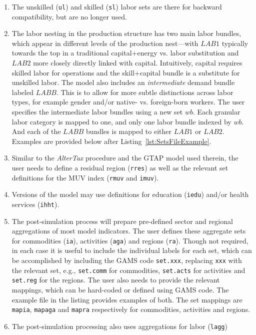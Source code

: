 \begin{enumerate}
\item The unskilled (\texttt{ul}) and skilled (\texttt{sl}) labor sets are there for
backward compatibility, but are no longer used.
\item The labor nesting in the production structure has two main labor bundles,
which appear in different levels of the production nest---with
$\mathit{LAB1}$ typically towards the top in a traditional capital+energy vs. labor
substitution and $\mathit{LAB2}$ more closely directly linked with capital. Intuitively,
capital requires skilled labor for operations and the skill+capital
bundle is a substitute for unskilled labor.
The model also includes an \emph{intermediate}
demand bundle labeled $\mathit{LABB}$. This is to allow for more
subtle distinctions across labor types, for example gender and/or
native- vs. foreign-born workers. The user specifies the
intermediate labor bundles using a new set $\mathit{wb}$. Each
granular labor category is mapped to one, and only one labor bundle
indexed by $\mathit{wb}$. And each of the $\mathit{LABB}$ bundles is mapped to
either $\mathit{LAB1}$ or $\mathit{LAB2}$. Examples are provided below
after Listing~\ref{lst:SetsFileExample}.
\item Similar to the \emph{AlterTax} procedure and the GTAP model used therein, the
user needs to define a residual region (\texttt{rres}) as well as the
relevant set definitions for the MUV index (\texttt{rmuv} and \texttt{imuv}).
\item Versions of the model may use definitions for education (\texttt{iedu}) and/or health
services (\texttt{ihht}).
\item The post-simulation process will prepare pre-defined sector and regional
aggregations of most model indicators. The user defines these aggregate
sets for commodities (\texttt{ia}), activities (\texttt{aga}) and regions (\texttt{ra}).
Though not required, in each case it is useful to include the individual labels
for each set, which can be accomplished by including the GAMS code \texttt{set.xxx},
replacing \texttt{xxx} with the relevant set, e.g., \texttt{set.comm} for commodities,
\texttt{set.acts} for activities and \texttt{set.reg} for the regions.
The user also needs to provide the relevant mappings, which can be
hard-coded or defined using GAMS code. The example file in the
listing provides examples of both. The set mappings are
\texttt{mapia}, \texttt{mapaga} and \texttt{mapra} respectively for
commodities, activities and regions.
\item The post-simulation processing also uses aggregations for labor (\texttt{lagg})

\end{enumerate}
